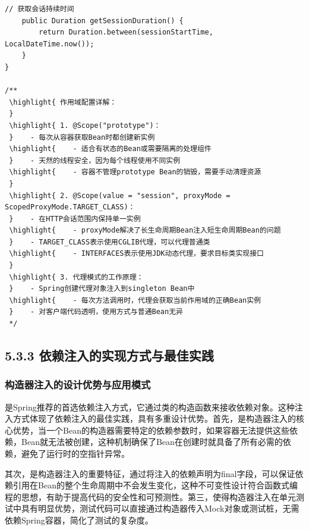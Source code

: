 \begin{lstlisting}[style=java]
    // 获取会话持续时间
    public Duration getSessionDuration() {
        return Duration.between(sessionStartTime, LocalDateTime.now());
    }
}

/**
 \highlight{ 作用域配置详解：
 } 
 \highlight{ 1. @Scope("prototype")：
 }    - 每次从容器获取Bean时都创建新实例
 \highlight{    - 适合有状态的Bean或需要隔离的处理组件
 }    - 天然的线程安全，因为每个线程使用不同实例
 \highlight{    - 容器不管理prototype Bean的销毁，需要手动清理资源
 } 
 \highlight{ 2. @Scope(value = "session", proxyMode = ScopedProxyMode.TARGET_CLASS)：
 }    - 在HTTP会话范围内保持单一实例
 \highlight{    - proxyMode解决了长生命周期Bean注入短生命周期Bean的问题
 }    - TARGET_CLASS表示使用CGLIB代理，可以代理普通类
 \highlight{    - INTERFACES表示使用JDK动态代理，要求目标类实现接口
 } 
 \highlight{ 3. 代理模式的工作原理：
 }    - Spring创建代理对象注入到singleton Bean中
 \highlight{    - 每次方法调用时，代理会获取当前作用域的正确Bean实例
 }    - 对客户端代码透明，使用方式与普通Bean无异
 */
\end{lstlisting}

\hypertarget{ux4f9dux8d56ux6ce8ux5165ux7684ux5b9eux73b0ux65b9ux5f0fux4e0eux6700ux4f73ux5b9eux8df5}{%
\subsection{5.3.3 依赖注入的实现方式与最佳实践}\label{ux4f9dux8d56ux6ce8ux5165ux7684ux5b9eux73b0ux65b9ux5f0fux4e0eux6700ux4f73ux5b9eux8df5}}

\hypertarget{ux6784ux9020ux5668ux6ce8ux5165ux7684ux8bbeux8ba1ux4f18ux52bfux4e0eux5e94ux7528ux6a21ux5f0f}{%
\subsubsection{构造器注入的设计优势与应用模式}\label{ux6784ux9020ux5668ux6ce8ux5165ux7684ux8bbeux8ba1ux4f18ux52bfux4e0eux5e94ux7528ux6a21ux5f0f}}

是Spring推荐的首选依赖注入方式，它通过类的构造函数来接收依赖对象。这种注入方式体现了依赖注入的最佳实践，具有多重设计优势。首先，是构造器注入的核心优势，当一个Bean的构造器需要特定的依赖参数时，如果容器无法提供这些依赖，Bean就无法被创建，这种机制确保了Bean在创建时就具备了所有必需的依赖，避免了运行时的空指针异常。

其次，是构造器注入的重要特征，通过将注入的依赖声明为final字段，可以保证依赖引用在Bean的整个生命周期中不会发生变化，这种不可变性设计符合函数式编程的思想，有助于提高代码的安全性和可预测性。第三，使得构造器注入在单元测试中具有明显优势，测试代码可以直接通过构造器传入Mock对象或测试桩，无需依赖Spring容器，简化了测试的复杂度。


